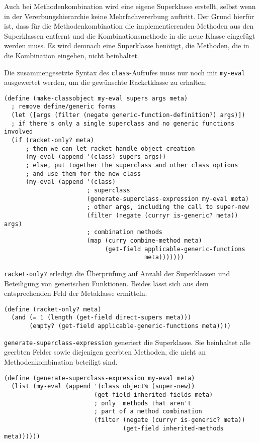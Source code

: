 Auch bei Methodenkombination wird eine eigene Superklasse erstellt, selbst wenn in der Vererbungshierarchie keine Mehrfachvererbung auftritt. Der Grund hierfür ist, dass  für die Methodenkombination die implementierenden Methoden aus den Superklassen entfernt und die Kombinationsmethode in die neue Klasse eingefügt werden muss. Es wird demnach eine Superklasse benötigt, die Methoden, die in die Kombination eingehen, nicht beinhaltet.

Die zusammengesetzte Syntax des \texttt{class}-Aufrufes muss nur noch mit \texttt{my-eval} ausgewertet werden, um die gewünschte Racketklasse zu erhalten:

\begin{lstlisting}
(define (make-classobject my-eval supers args meta)
  ; remove define/generic forms
  (let ([args (filter (negate generic-function-definition?) args)])
  ; if there's only a single superclass and no generic functions involved
  (if (racket-only? meta)
      ; then we can let racket handle object creation
      (my-eval (append '(class) supers args))
      ; else, put together the superclass and other class options
      ; and use them for the new class
      (my-eval (append '(class)
                       ; superclass
                       (generate-superclass-expression my-eval meta)
                       ; other args, including the call to super-new
                       (filter (negate (curryr is-generic? meta)) args)
                       ; combination methods
                       (map (curry combine-method meta)
                            (get-field applicable-generic-functions
                                       meta)))))))
\end{lstlisting}

\texttt{racket-only?} erledigt die Überprüfung auf Anzahl der Superklassen und Beteiligung von generischen Funktionen. Beides lässt sich aus dem entsprechenden Feld der Metaklasse ermitteln. 

\begin{lstlisting}
(define (racket-only? meta)
  (and (= 1 (length (get-field direct-supers meta)))
       (empty? (get-field applicable-generic-functions meta))))
\end{lstlisting}

\texttt{generate-superclass-expression} generiert die Superklasse. Sie beinhaltet alle geerbten Felder sowie diejenigen geerbten Methoden, die nicht an Methodenkombination beteiligt sind. 

\begin{lstlisting}
(define (generate-superclass-expression my-eval meta)
  (list (my-eval (append '(class object% (super-new))
                         (get-field inherited-fields meta)
                         ; only  methods that aren't
                         ; part of a method combination
                         (filter (negate (curryr is-generic? meta))
                                 (get-field inherited-methods meta))))))
\end{lstlisting}

